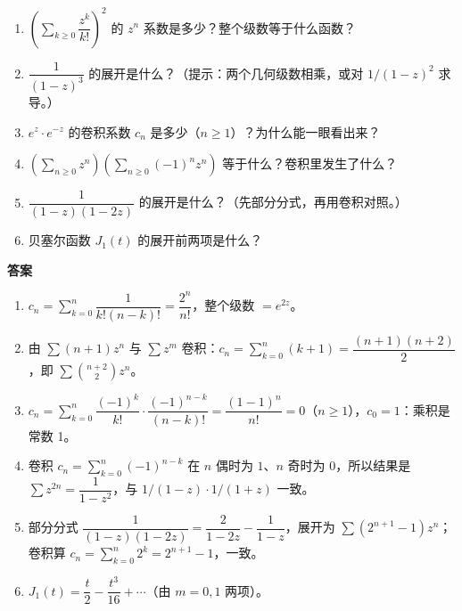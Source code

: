 \documentclass[11pt]{ctexart}
\let\orighdr\hdr
\renewcommand{\hdr}[2]{\par\needspace{9\baselineskip}\orighdr{#1}{#2}}
\begin{document}





\begin{enumerate}
\item $\left(\sum_{k\ge0}\dfrac{z^k}{k!}\right)^2$ 的 $z^n$ 系数是多少？整个级数等于什么函数？
\item $\dfrac{1}{(1-z)^3}$ 的展开是什么？（提示：两个几何级数相乘，或对 $1/(1-z)^2$ 求导。）
\item $e^{z}\cdot e^{-z}$ 的卷积系数 $c_n$ 是多少（$n\ge1$）？为什么能一眼看出来？
\item $\left(\sum_{n\ge0}z^n\right)\left(\sum_{n\ge0}(-1)^nz^n\right)$ 等于什么？卷积里发生了什么？
\item $\dfrac{1}{(1-z)(1-2z)}$ 的展开是什么？（先部分分式，再用卷积对照。）
\item 贝塞尔函数 $J_1(t)$ 的展开前两项是什么？
\end{enumerate}

\textbf{答案}

\begin{enumerate}
\item $c_n=\sum_{k=0}^{n}\dfrac{1}{k!(n-k)!}=\dfrac{2^n}{n!}$，整个级数 $=e^{2z}$。
\item 由 $\sum(n+1)z^n$ 与 $\sum z^m$ 卷积：$c_n=\sum_{k=0}^{n}(k+1)=\dfrac{(n+1)(n+2)}{2}$，即 $\sum\binom{n+2}{2}z^n$。
\item $c_n=\sum_{k=0}^{n}\dfrac{(-1)^k}{k!}\cdot\dfrac{(-1)^{n-k}}{(n-k)!}=\dfrac{(1-1)^n}{n!}=0$（$n\ge1$），$c_0=1$：乘积是常数 1。
\item 卷积 $c_n=\sum_{k=0}^{n}(-1)^{n-k}$ 在 $n$ 偶时为 $1$、$n$ 奇时为 $0$，所以结果是 $\sum z^{2n}=\dfrac{1}{1-z^2}$，与 $1/(1-z)\cdot1/(1+z)$ 一致。
\item 部分分式 $\dfrac{1}{(1-z)(1-2z)}=\dfrac{2}{1-2z}-\dfrac{1}{1-z}$，展开为 $\sum(2^{n+1}-1)z^n$；卷积算 $c_n=\sum_{k=0}^{n}2^k=2^{n+1}-1$，一致。
\item $J_1(t)=\dfrac t2-\dfrac{t^3}{16}+\cdots$（由 $m=0,1$ 两项）。
\end{enumerate}
\end{document}
